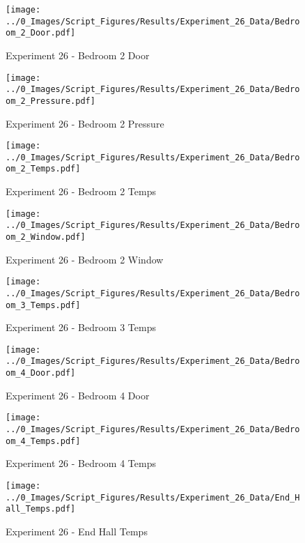 	\begin{figure}[H]
		\centering
		\texttt{[image: ../0\_Images/Script\_Figures/Results/Experiment\_26\_Data/Bedroom\_2\_Door.pdf]}
		\caption[]{Experiment 26 - Bedroom 2 Door}
	\end{figure}
 
	\clearpage

	\begin{figure}[H]
		\centering
		\texttt{[image: ../0\_Images/Script\_Figures/Results/Experiment\_26\_Data/Bedroom\_2\_Pressure.pdf]}
		\caption[]{Experiment 26 - Bedroom 2 Pressure}
	\end{figure}
 

	\begin{figure}[H]
		\centering
		\texttt{[image: ../0\_Images/Script\_Figures/Results/Experiment\_26\_Data/Bedroom\_2\_Temps.pdf]}
		\caption[]{Experiment 26 - Bedroom 2 Temps}
	\end{figure}
 
	\clearpage

	\begin{figure}[H]
		\centering
		\texttt{[image: ../0\_Images/Script\_Figures/Results/Experiment\_26\_Data/Bedroom\_2\_Window.pdf]}
		\caption[]{Experiment 26 - Bedroom 2 Window}
	\end{figure}
 

	\begin{figure}[H]
		\centering
		\texttt{[image: ../0\_Images/Script\_Figures/Results/Experiment\_26\_Data/Bedroom\_3\_Temps.pdf]}
		\caption[]{Experiment 26 - Bedroom 3 Temps}
	\end{figure}
 
	\clearpage

	\begin{figure}[H]
		\centering
		\texttt{[image: ../0\_Images/Script\_Figures/Results/Experiment\_26\_Data/Bedroom\_4\_Door.pdf]}
		\caption[]{Experiment 26 - Bedroom 4 Door}
	\end{figure}
 

	\begin{figure}[H]
		\centering
		\texttt{[image: ../0\_Images/Script\_Figures/Results/Experiment\_26\_Data/Bedroom\_4\_Temps.pdf]}
		\caption[]{Experiment 26 - Bedroom 4 Temps}
	\end{figure}
 
	\clearpage

	\begin{figure}[H]
		\centering
		\texttt{[image: ../0\_Images/Script\_Figures/Results/Experiment\_26\_Data/End\_Hall\_Temps.pdf]}
		\caption[]{Experiment 26 - End Hall Temps}
	\end{figure}
 


